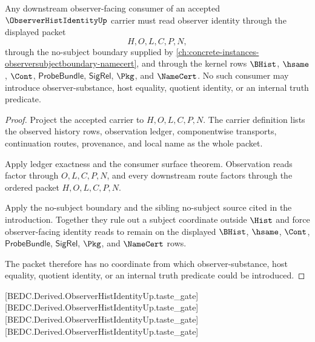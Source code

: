 \begin{theorem}\label{thm:observer-hist-identity-scoped-consumer-interface}
Any downstream observer-facing consumer of an accepted $\ObserverHistIdentityUp$ carrier must read observer identity through the displayed packet
$$
H,O,L,C,P,N,
$$
through the no-subject boundary supplied by \autoref{ch:concrete-instances-observersubjectboundary-namecert}, and through the kernel rows $\BHist$, $\hsame$, $\Cont$, $\mathsf{ProbeBundle}$, $\mathsf{SigRel}$, $\Pkg$, and $\NameCert$. No such consumer may introduce observer-substance, host equality, quotient identity, or an internal truth predicate.
\end{theorem}
\begin{proof}
Project the accepted carrier to $H,O,L,C,P,N$. The carrier definition lists the observed history rows, observation ledger, componentwise transports, continuation routes, provenance, and local name as the whole packet.

Apply ledger exactness and the consumer surface theorem. Observation reads factor through $O,L,C,P,N$, and every downstream route factors through the ordered packet $H,O,L,C,P,N$.

Apply the no-subject boundary and the sibling no-subject source cited in the introduction. Together they rule out a subject coordinate outside $\Hist$ and force observer-facing identity reads to remain on the displayed $\BHist$, $\hsame$, $\Cont$, $\mathsf{ProbeBundle}$, $\mathsf{SigRel}$, $\Pkg$, and $\NameCert$ rows.

The packet therefore has no coordinate from which observer-substance, host equality, quotient identity, or an internal truth predicate could be introduced.
\end{proof}

[BEDC.Derived.ObserverHistIdentityUp.taste\_gate]
[BEDC.Derived.ObserverHistIdentityUp.taste\_gate]
[BEDC.Derived.ObserverHistIdentityUp.taste\_gate]
[BEDC.Derived.ObserverHistIdentityUp.taste\_gate]

